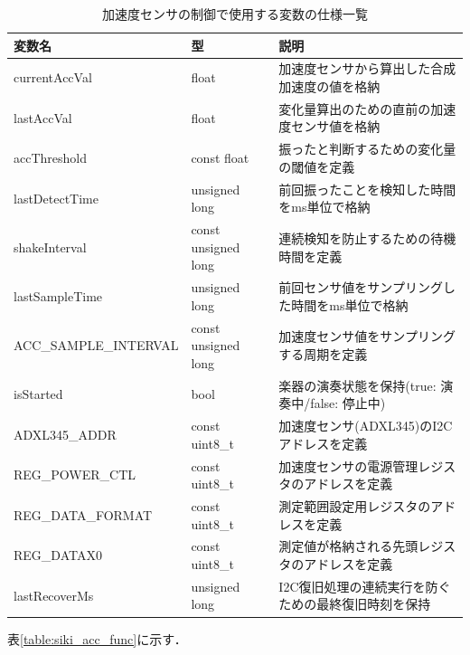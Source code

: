 \begin{table}[H]
    \caption{加速度センサの制御で使用する変数の仕様一覧}
    \centering
    \label{table:siki_acc_var}
    \begin{tabular}{p{3.9cm}p{3.4cm}p{6.2cm}}
    \hline
    \textbf{変数名} & \textbf{型} & \textbf{説明}\\
    \hline
    currentAccVal & float & 加速度センサから算出した合成加速度の値を格納\\
    \hline
    lastAccVal & float & 変化量算出のための直前の加速度センサ値を格納\\
    \hline
    accThreshold & const float & 振ったと判断するための変化量の閾値を定義\\
    \hline
    lastDetectTime & unsigned long & 前回振ったことを検知した時間をms単位で格納\\
    \hline
    shakeInterval & const unsigned long & 連続検知を防止するための待機時間を定義\\
    \hline
    lastSampleTime & unsigned long & 前回センサ値をサンプリングした時間をms単位で格納\\
    \hline
    ACC\_SAMPLE\_INTERVAL & const unsigned long & 加速度センサ値をサンプリングする周期を定義\\
    \hline
    isStarted & bool & 楽器の演奏状態を保持(true: 演奏中/false: 停止中)\\
    \hline
    ADXL345\_ADDR & const uint8\_t & 加速度センサ(ADXL345)のI2Cアドレスを定義\\
    \hline
    REG\_POWER\_CTL & const uint8\_t & 加速度センサの電源管理レジスタのアドレスを定義\\
    \hline
    REG\_DATA\_FORMAT & const uint8\_t & 測定範囲設定用レジスタのアドレスを定義\\
    \hline
    REG\_DATAX0 & const uint8\_t & 測定値が格納される先頭レジスタのアドレスを定義\\
    \hline
    lastRecoverMs & unsigned long & I2C復旧処理の連続実行を防ぐための最終復旧時刻を保持\\
    \hline
    \end{tabular}
\end{table}

\fi




\iffalse
表\ref{table:siki_acc_func}に示す．

